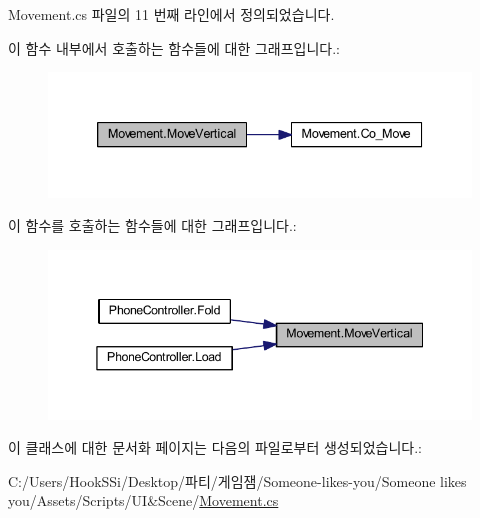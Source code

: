 Movement.\+cs 파일의 11 번째 라인에서 정의되었습니다.


\begin{DoxyCode}{0}

\end{DoxyCode}
이 함수 내부에서 호출하는 함수들에 대한 그래프입니다.\+:\nopagebreak
\begin{figure}[H]
\begin{center}
\leavevmode
\includegraphics[width=339pt]{d1/de2/class_movement_a2984f510496fd8a5df663ad68e0fab17_cgraph}
\end{center}
\end{figure}
이 함수를 호출하는 함수들에 대한 그래프입니다.\+:\nopagebreak
\begin{figure}[H]
\begin{center}
\leavevmode
\includegraphics[width=345pt]{d1/de2/class_movement_a2984f510496fd8a5df663ad68e0fab17_icgraph}
\end{center}
\end{figure}


이 클래스에 대한 문서화 페이지는 다음의 파일로부터 생성되었습니다.\+:\begin{DoxyCompactItemize}
\item 
C\+:/\+Users/\+Hook\+S\+Si/\+Desktop/파티/게임잼/\+Someone-\/likes-\/you/\+Someone likes you/\+Assets/\+Scripts/\+U\+I\&\+Scene/\mbox{\hyperlink{_movement_8cs}{Movement.\+cs}}\end{DoxyCompactItemize}
